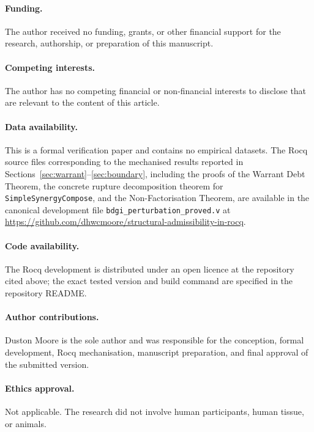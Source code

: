\documentclass[pdflatex,sn-mathphys-num]{sn-jnl}
\theoremstyle{plain}
\theoremstyle{definition}
\theoremstyle{remark}
\begin{document}
\paragraph{Funding.}
The author received no funding, grants, or other financial support
for the research, authorship, or preparation of this manuscript.

\paragraph{Competing interests.}
The author has no competing financial or non-financial interests to
disclose that are relevant to the content of this article.

\paragraph{Data availability.}
This is a formal verification paper and contains no empirical
datasets. The Rocq source files corresponding to the mechanised
results reported in Sections~\ref{sec:warrant}--\ref{sec:boundary},
including the proofs of the Warrant Debt Theorem, the concrete
rupture decomposition theorem for \texttt{SimpleSynergyCompose}, and
the Non-Factorisation Theorem, are available in the canonical
development file \texttt{bdgi\_perturbation\_proved.v} at
\url{https://github.com/dhwcmoore/structural-admissibility-in-rocq}.

\paragraph{Code availability.}
The Rocq development is distributed under an open licence at the
repository cited above; the exact tested version and build command are
specified in the repository README.

\paragraph{Author contributions.}
Duston Moore is the sole author and was responsible for the conception,
formal development, Rocq mechanisation, manuscript preparation, and
final approval of the submitted version.

\paragraph{Ethics approval.}
Not applicable. The research did not involve human participants,
human tissue, or animals.
\end{document}
